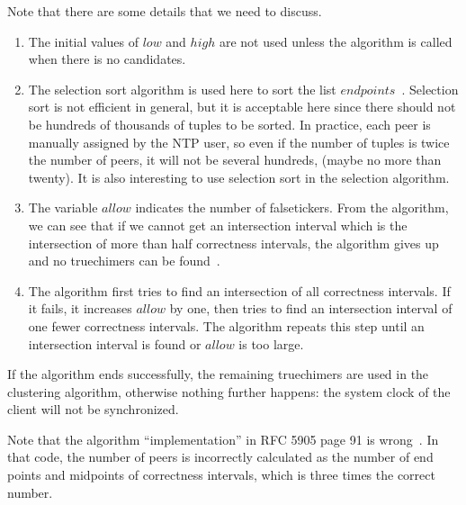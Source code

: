 Note that there are some details that we need to discuss. 
\begin{enumerate}
    \item 
        The initial values of $low$ and $high$ are not used unless the
        algorithm is called when there is no candidates.
    \item 
        The selection sort algorithm is used here to sort the list
        $endpoints$~\cite{source_code}. Selection sort is not efficient in
        general, but
        it is acceptable here since there should not be hundreds of thousands
        of tuples to be sorted. In practice, each peer is manually assigned by
        the NTP user, so even if the number of tuples is twice the
        number of peers, it will not be several hundreds, (maybe no more than
        twenty). It is also interesting to use selection sort in the selection
        algorithm.
    \item
        The variable $allow$ indicates the number of falsetickers. From the
        algorithm, we can see that if we cannot get an intersection interval
        which is the intersection of more than half correctness intervals,
        the algorithm gives up and no truechimers can be
        found~\cite{clock_selection}.
    \item
        The algorithm first tries to find an intersection of all correctness
        intervals. If it fails, it increases $allow$ by one, then tries to find
        an intersection interval of one fewer correctness intervals. The
        algorithm
        repeats this step until an intersection interval is found or $allow$
        is too large.
\end{enumerate}
If the algorithm ends successfully, the remaining truechimers are used in the
clustering algorithm, otherwise nothing further happens: the system clock of
the client will not be synchronized.

Note that the algorithm ``implementation'' in RFC 5905 page 91 is 
wrong~\cite{rfc5905}. In that code, the number of peers is incorrectly
calculated as the number of end points and midpoints of correctness intervals,
which is three times the correct number.


